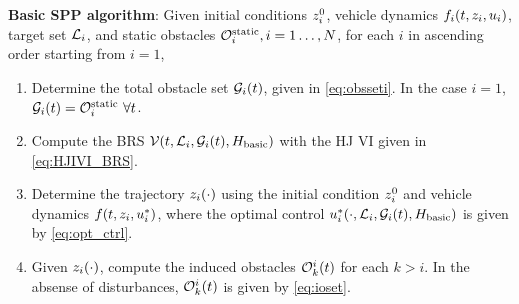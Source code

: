 \begin{alg}
\textbf{Basic SPP algorithm}: Given initial conditions $z_i^0$, vehicle dynamics $f_i(t, z_i, u_i)$, target set $\mathcal{L}_i$, and static obstacles $\mathcal{O}^\text{static}_i, i = 1\ldots, N$, for each $i$ in ascending order starting from $i=1$,
\begin{enumerate}
\item Determine the total obstacle set $\mathcal{G}_i(t)$, given in \eqref{eq:obsseti}. In the case $i=1$, $\mathcal{G}_i(t) = \mathcal{O}^\text{static}_i ~ \forall t$.
\item Compute the BRS $\mathcal{V}(t, \mathcal{L}_i, \mathcal{G}_i(t), H_\text{basic})$ with the HJ VI given in  \eqref{eq:HJIVI_BRS}.
\item Determine the trajectory $z_i(\cdot)$ using the initial condition $z_i^0$ and vehicle dynamics $f(t, z_i, u_i^*)$, where the optimal control  $u_i^*(\cdot, \mathcal{L}_i, \mathcal{G}_i(t), H_\text{basic})$ is given by \eqref{eq:opt_ctrl}.
\item Given $z_i(\cdot)$, compute the induced obstacles $\mathcal{O}_k^i(t)$ for each $k>i$. In the absense of disturbances, $\mathcal{O}_k^i(t)$ is given by \eqref{eq:ioset}.
\end{enumerate}
\end{alg}